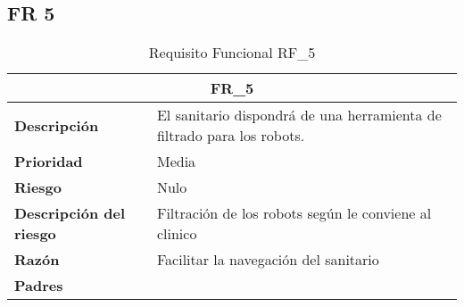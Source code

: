 \documentclass{scrreprt}
\begin{document}
\subsection{FR 5}
    \begin{table}[H]
        \label{tab:my-table}
        \begin{tabular}{|p{5cm}|p{11cm}|}
        \hline
        \multicolumn{2}{|c|}{\textbf{FR_5}} \\
        \hline
        \textbf{Descripción  }                      &  El sanitario dispondrá de una herramienta de filtrado para los robots.                                                                       \\ \hline
        \textbf{Prioridad}                          & Media                                                                                              \\ \hline
        \textbf{Riesgo}                          & Nulo                                                                                                \\ \hline
        \textbf{Descripción del riesgo}                    & Filtración de los robots según le conviene al clinico                         \\ \hline
        \textbf{Razón}                   & Facilitar la navegación del sanitario                                                                                                                \\ \hline
        \textbf{Padres}                               &  \\  \hline
        \end{tabular}%
        
        \caption{Requisito Funcional RF_5}
\end{table}
\end{document}
